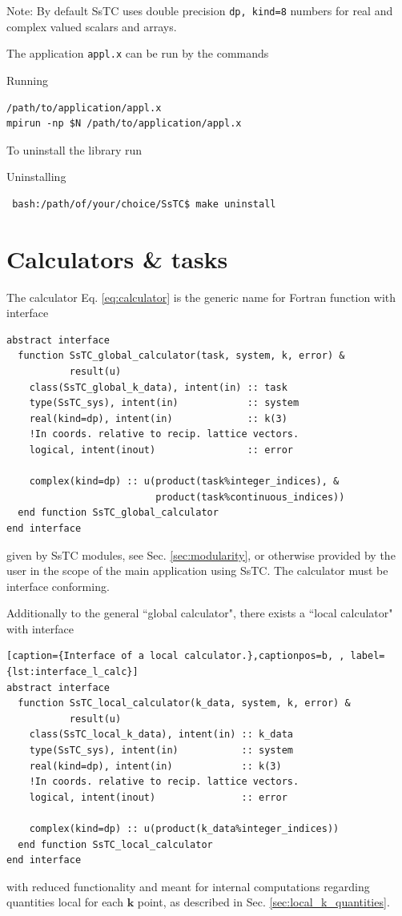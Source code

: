 \documentclass[10pt,a4paper]{article}
\begin{document}
Note:  By default SsTC uses double precision \verb|dp, kind=8| numbers for real and complex valued scalars and arrays.

The application \verb|appl.x| can be run by the commands
\begin{codebox}{Running}
\begin{verbatim}
/path/to/application/appl.x
mpirun -np $N /path/to/application/appl.x
\end{verbatim}
\end{codebox}

To uninstall the library run
\begin{codebox}{Uninstalling}
\begin{verbatim}
 bash:/path/of/your/choice/SsTC$ make uninstall
\end{verbatim}
\end{codebox}
\section{Calculators \& tasks}
The calculator Eq. \eqref{eq:calculator} is the generic name for Fortran function with interface
\begin{codebox}{}
\begin{lstlisting}[caption={Interface of a global calculator.},captionpos=b, label={lst:interface_g_calc}]
abstract interface
  function SsTC_global_calculator(task, system, k, error) &
           result(u)
    class(SsTC_global_k_data), intent(in) :: task
    type(SsTC_sys), intent(in)            :: system
    real(kind=dp), intent(in)             :: k(3)
    !In coords. relative to recip. lattice vectors.
    logical, intent(inout)                :: error

    complex(kind=dp) :: u(product(task%integer_indices), &
                          product(task%continuous_indices))
  end function SsTC_global_calculator
end interface
\end{lstlisting}
\end{codebox}
given by SsTC modules, see Sec. \ref{sec:modularity}, or otherwise provided by the user in the scope of the main application using SsTC. The calculator must be interface conforming.

Additionally to the general ``global calculator", there exists a ``local calculator" with interface
\begin{codebox}{}
\begin{lstlisting}[caption={Interface of a local calculator.},captionpos=b, , label={lst:interface_l_calc}]
abstract interface
  function SsTC_local_calculator(k_data, system, k, error) &
           result(u)
    class(SsTC_local_k_data), intent(in) :: k_data
    type(SsTC_sys), intent(in)           :: system
    real(kind=dp), intent(in)            :: k(3)
    !In coords. relative to recip. lattice vectors.
    logical, intent(inout)               :: error

    complex(kind=dp) :: u(product(k_data%integer_indices))
  end function SsTC_local_calculator
end interface
\end{lstlisting}
\end{codebox}
with reduced functionality and meant for internal computations regarding quantities local for each $\bm{k}$ point, as described in Sec. \ref{sec:local_k_quantities}.
\end{document}
